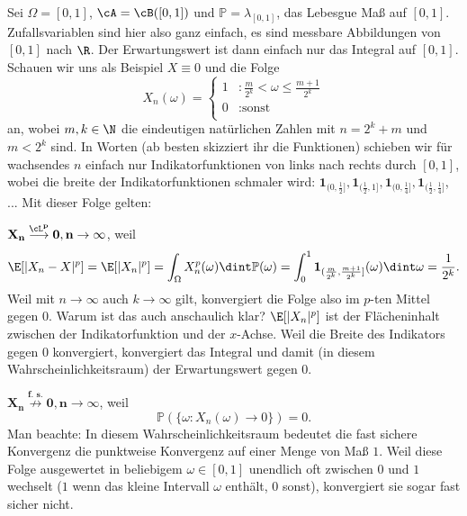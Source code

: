 \begin{beispiel}
	Sei $\Omega = [0,1]$, $\cA = \cB([0,1])$ und $\mathbb{P} = \lambda_{[0,1]}$, das Lebesgue Ma\ss{} auf $[0,1]$. Zufallsvariablen sind hier also ganz einfach, es sind messbare Abbildungen von $[0,1]$ nach $\R$. Der Erwartungswert ist dann einfach nur das Integral auf $[0,1]$. Schauen wir uns als Beispiel $X \equiv 0$ und die Folge
	\[ X_n(\omega) = \begin{cases}
	1&:\frac{m}{2^k} < \omega \leq \frac{m+1}{2^k}\\
	0&: \text{sonst}\\
	\end{cases} \]
	an, wobei $m,k \in \N$ die eindeutigen nat\"urlichen Zahlen mit $n = 2^k + m$ und $m < 2^k$ sind. In Worten (ab besten skizziert ihr die Funktionen) schieben wir f\"ur wachsendes $n$ einfach nur Indikatorfunktionen von links nach rechts durch $[0,1]$, wobei die breite der Indikatorfunktionen schmaler wird: $\mathbf 1_{(0,\frac 1 2]}, \mathbf 1_{(\frac 1 2, 1]}, \mathbf 1_{(0,\frac 1 4]}, \mathbf 1_{(\frac 1 2, \frac 1 4]}$, ... 
Mit dieser Folge gelten:\smallskip	
	
	$\mathbf{X_n \overset{\cL^p}{\longrightarrow} 0, n \to \infty}$, weil
	\begin{gather*}
		\E[|X_n-X|^p] = \E[|X_n|^p] = \int_{\Omega} X_n^p(\omega) \dint \mathbb{P}(\omega) = \int_{0}^{1} \mathbf 1_{(\frac{m}{2^k},\frac{m+1}{2^k}]}(\omega) \dint\omega = \frac{1}{2^k}.
	\end{gather*}
	Weil mit $n\to\infty$ auch $k\to \infty$ gilt, konvergiert die Folge also im $p$-ten Mittel gegen $0$. Warum ist das auch anschaulich klar? $\E[|X_n|^p]$ ist der Fl\"acheninhalt zwischen der Indikatorfunktion und der $x$-Achse. Weil die Breite des Indikators gegen $0$ konvergiert, konvergiert das Integral und damit (in diesem Wahrscheinlichkeitsraum) der Erwartungswert gegen $0$.\smallskip	
	
	$\mathbf{X_n \overset{\text{f. s.}}{\not\longrightarrow} 0, n \to \infty}$, weil 
	$$\mathbb{P}(\{ \omega\colon X_n(\omega) \to 0 \}) = 0.$$
	Man beachte: In diesem Wahrscheinlichkeitsraum bedeutet die fast sichere Konvergenz die punktweise Konvergenz auf einer Menge von Ma\ss{} $1$. Weil diese Folge ausgewertet in beliebigem $\omega\in [0,1]$ unendlich oft zwischen $0$ und $1$ wechselt ($1$ wenn das kleine Intervall $\omega$ enth\"alt, $0$ sonst), konvergiert sie sogar fast sicher nicht. 
\end{beispiel}
